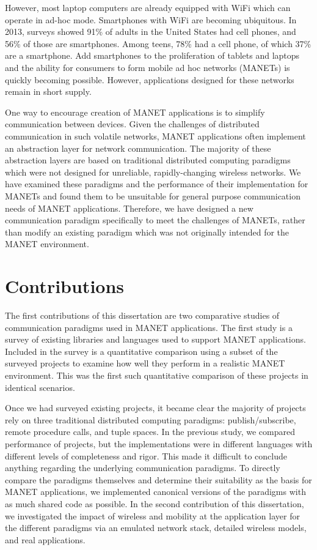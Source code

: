 However, most laptop computers are already equipped with WiFi which can operate in ad-hoc mode. Smartphones with WiFi are becoming ubiquitous. In 2013, surveys showed 91\% of adults in the United States had cell phones, and 56\% of those are smartphones\cite{cellphones}. Among teens, 78\% had a cell phone, of which 37\% are a smartphone\cite{teenphones}. Add smartphones to the proliferation of tablets and laptops and the ability for consumers to form mobile ad hoc networks (MANETs) is quickly becoming possible. However, applications designed for these networks remain in short supply.

One way to encourage creation of MANET applications is to simplify communication between devices. Given the challenges of distributed communication in such volatile networks, MANET applications often implement an abstraction layer for network communication. The majority of these abstraction layers are based on traditional distributed computing paradigms which were not designed for unreliable, rapidly-changing wireless networks. We have examined these paradigms and the performance of their implementation for MANETs and found them to be unsuitable for general purpose communication needs of MANET applications. Therefore, we have designed a new communication paradigm specifically to meet the challenges of MANETs, rather than modify an existing paradigm which was not originally intended for the MANET environment.

\section{Contributions}

The first contributions of this dissertation are two comparative studies of communication paradigms used in MANET applications. The first study is a survey of existing libraries and languages used to support MANET applications. Included in the survey is a quantitative comparison using a subset of the surveyed projects to examine how well they perform in a realistic MANET environment. This was the first such quantitative comparison of these projects in identical scenarios.

Once we had surveyed existing projects, it became clear the majority of projects rely on three traditional distributed computing paradigms: publish/subscribe, remote procedure calls, and tuple spaces. In the previous study, we compared performance of projects, but the implementations were in different languages with different levels of completeness and rigor. This made it difficult to conclude anything regarding the underlying communication paradigms. To directly compare the paradigms themselves and determine their suitability as the basis for MANET applications, we implemented canonical versions of the paradigms with as much shared code as possible. In the second contribution of this dissertation, we investigated the impact of wireless and mobility at the application layer for the different paradigms via an emulated network stack, detailed wireless models, and real applications.


